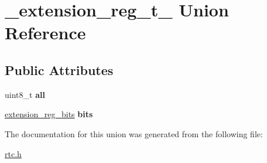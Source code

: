 \hypertarget{union__extension__reg__t__}{}\section{\+\_\+extension\+\_\+reg\+\_\+t\+\_\+ Union Reference}
\label{union__extension__reg__t__}
\subsection*{Public Attributes}
\begin{DoxyCompactItemize}
\item 
\mbox{\label{union__extension__reg__t___a08c9f1846b9567450bdef6c9a7ff38c8}} 
uint8\+\_\+t {\bfseries all}
\item 
\mbox{\label{union__extension__reg__t___a38b3670f59c78f18f546cd5970fd5426}} 
\hyperlink{structextension__reg__bits__t}{extension\+\_\+reg\+\_\+bits} {\bfseries bits}
\end{DoxyCompactItemize}


The documentation for this union was generated from the following file\+:\begin{DoxyCompactItemize}
\item 
\hyperlink{rtc_8h}{rtc.\+h}\end{DoxyCompactItemize}
